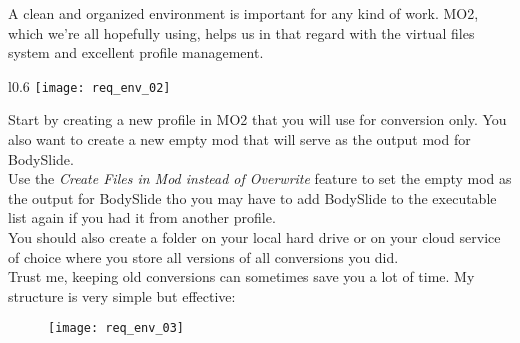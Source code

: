 A clean and organized environment is important for any kind of work. MO2, which we're all hopefully using, helps us in that 
regard with the virtual files system and excellent profile management.

\begin{wrapfigure}{l}{0.6\textwidth}
    \texttt{[image: req\_env\_02]}
\end{wrapfigure}
Start by creating a new profile in MO2 that you will use for conversion only. You also want to create a new empty mod that will 
serve as the output mod for BodySlide.\\
Use the \textit{Create Files in Mod instead of Overwrite} feature to set the empty mod as the output for BodySlide tho you may have 
to add BodySlide to the executable list again if you had it from another profile.\\
You should also create a folder on your local hard drive or on your cloud service of choice where you store all 
versions of all conversions you did.\\
\linebreak
Trust me, keeping old conversions can sometimes save you a lot of time. My structure is very simple but effective:
\begin{figure}[h]
    \texttt{[image: req\_env\_03]}
\end{figure}